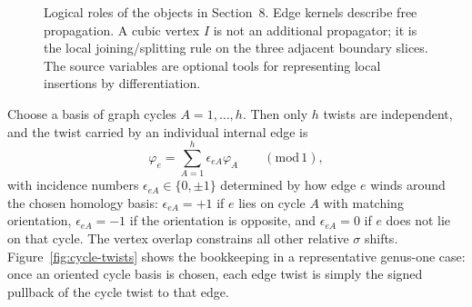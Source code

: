 \documentclass[11pt]{article}
\numberwithin{equation}{section}
\begin{document}
\begin{figure}[t]
\centering
{}
\caption{Logical roles of the objects in Section~8. Edge kernels describe free propagation. A cubic vertex $I$ is not an additional propagator; it is the local joining/splitting rule on the three adjacent boundary slices. The source variables are optional tools for representing local insertions by differentiation.}
\label{fig:sewing-roles}
\end{figure}

Choose a basis of graph cycles $A=1,\dots,h$. Then only $h$ twists are independent, and the twist carried by an individual internal edge is
\begin{equation}
\label{eq:s8-002}
\varphi_e=\sum_{A=1}^{h}\epsilon_{eA}\varphi_A
\qquad
(\mathrm{mod}\,1),
\end{equation}
with incidence numbers $\epsilon_{eA}\in\{0,\pm1\}$ determined by how edge $e$ winds around the chosen homology basis: $\epsilon_{eA}=+1$ if $e$ lies on cycle $A$ with matching orientation, $\epsilon_{eA}=-1$ if the orientation is opposite, and $\epsilon_{eA}=0$ if $e$ does not lie on that cycle. The vertex overlap constrains all other relative $\sigma$ shifts.
Figure~\ref{fig:cycle-twists} shows the bookkeeping in a representative genus-one case: once an oriented cycle basis is chosen, each edge twist is simply the signed pullback of the cycle twist to that edge.
\end{document}

